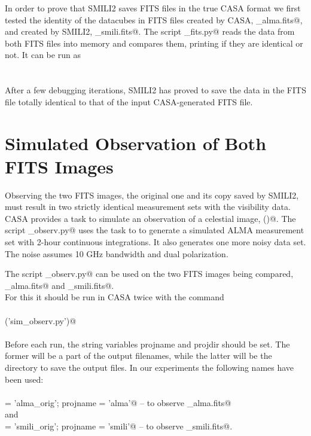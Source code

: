 \documentclass[preprint]{aastex}
\begin{document}
In order to prove that SMILI2 saves FITS files in the true CASA format we first tested the identity of the datacubes in FITS files created by CASA, \verb@RoundSpottyDisk_alma.fits@, and created by SMILI2, \verb@RoundSpottyDisk_smili.fits@. The script \verb@diff_fits.py@ reads the data from both FITS files into memory and compares them, printing if they are identical or not. It can be run as \\
\\
\verb@%run diff_fits.py@ \\
\\
After a few debugging iterations, SMILI2 has proved to save the data in the FITS file totally identical to that of the input CASA-generated FITS file.


\section{Simulated Observation of Both FITS Images}

Observing the two FITS images, the original one and its copy saved by SMILI2, must result in two strictly identical measurement sets with the visibility data. CASA provides a task to simulate an observation of a celestial image, \verb@simobserve()@. The script \verb@sim_observ.py@ uses the task to to generate a simulated ALMA measurement set with 2-hour continuous integrations. It also generates one more noisy data set. The noise assumes 10 GHz bandwidth and dual polarization. 

The script \verb@sim_observ.py@ can be used on the two FITS images being compared, \\ \verb@RoundSpottyDisk_alma.fits@ and \verb@RoundSpottyDisk_smili.fits@. \\
For this it should be run in CASA twice with the command \\
\\
\verb@execfile('sim_observ.py')@ \\
\\
Before each run, the string variables projname and projdir should be set. The former will be a part of the output filenames, while the latter will be the directory to save the output files. In our experiments the following names have been used: \\ \\
\verb@projdir = 'alma_orig'; projname = 'alma'@ -- to observe \verb@RoundSpottyDisk_alma.fits@ \\
and \\
\verb@projdir = 'smili_orig'; projname = 'smili'@ -- to observe \verb@RoundSpottyDisk_smili.fits@. \\
\end{document}
